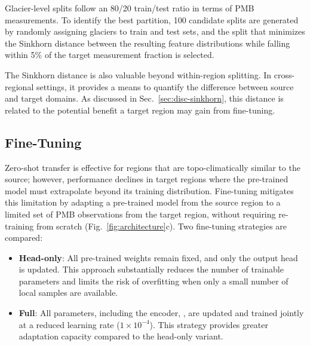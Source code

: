 \documentclass[draft]{agujournal2019}
\begin{document}
Glacier-level splits follow an 80/20 train/test ratio in terms of PMB measurements. To identify the best partition, 100 candidate splits are generated by randomly assigning glaciers to train and test sets, and the split that minimizes the Sinkhorn distance between the resulting feature distributions while falling within 5\% of the target measurement fraction is selected. 


The Sinkhorn distance is also valuable beyond within-region splitting. In cross-regional settings, it provides a means to quantify the difference between source and target domains. As discussed in Sec.~\ref{sec:disc-sinkhorn}, this distance is related to the potential benefit a target region may gain from fine-tuning.

\subsection{Fine-Tuning}\label{subsec:finetuning}

Zero-shot transfer is effective for regions that are topo-climatically similar to the source; however, performance declines in target regions where the pre-trained model must extrapolate beyond its training distribution. Fine-tuning mitigates this limitation by adapting a pre-trained model from the source region to a limited set of PMB observations from the target region, without requiring re-training from scratch (Fig.~\ref{fig:architecture}c).  Two fine-tuning strategies are compared:

\begin{itemize}
    \item \textbf{Head-only}: All pre-trained weights remain fixed, and only the output head is updated.  This approach substantially reduces the number of trainable parameters and limits the risk of overfitting when only a small number of local samples are available.
    \item \textbf{Full}: All parameters, including the encoder, , are updated and trained jointly at a reduced learning rate ($1 \times 10^{-4}$).  This strategy provides greater adaptation capacity compared to the head-only variant.
\end{itemize}
\end{document}

